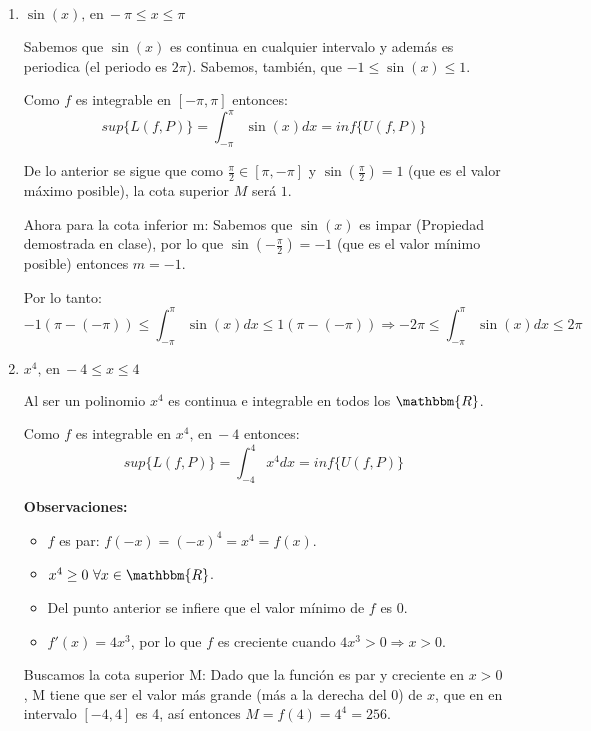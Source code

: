 \documentclass[12pt]{article}
\begin{document}
\begin{enumerate}[\hspace{9px} a)]
    \item \(\sin(x) \text{, en} \ -\pi \leq x \leq \pi\)\bigskip

        Sabemos que $\sin(x)$ es continua en cualquier intervalo y además es periodica (el periodo es $2\pi$). Sabemos, tambi\'en, que $-1\leq \sin(x)\leq 1$.\bigskip
        
        Como $f$ es integrable en $[-\pi,\pi]$ entonces: \[sup\{L(f,P)\}=\displaystyle\int_{-\pi}^{\pi}\sin(x)dx=inf\{U(f,P)\}\]
        
        De lo anterior se sigue que como \(\displaystyle\frac{\pi}{2}\in[\pi,-\pi]\) y $\sin\left(\displaystyle\frac{\pi}{2}\right)=1$ (que es el valor m\'aximo posible), la cota superior $M$ será $1$.\bigskip
        
        Ahora para la cota inferior m: Sabemos que $\sin(x)$ es impar (Propiedad demostrada en clase), por lo que \(\sin\left(-\displaystyle\frac{\pi}{2}\right)=-1\) (que  es el valor m\'inimo posible) entonces $m=-1$.\bigskip

        Por lo tanto: 
        \[-1(\pi-(-\pi)) \leq \int_{-\pi}^{\pi}\sin(x)dx \leq 1(\pi-(-\pi)) \Rightarrow -2\pi \leq \int_{-\pi}^{\pi}\sin(x)dx \leq 2\pi\]

    \item \(x^4 \text{, en} \ -4 \leq x \leq 4\)\bigskip

        Al ser un polinomio $x^4$ es continua e integrable en todos los $\mathbbm{R}$.\bigskip

        Como $f$ es integrable en \(x^4 \text{, en} \ -4\) entonces:  \[sup\{L(f,P)\}=\displaystyle\int_{-4}^{4}x^4dx=inf\{U(f,P)\}\]

        \textbf{Observaciones:}
        \begin{itemize}
            \item $f$ es par: \(f(-x)=(-x)^4=x^4=f(x)\).
            \item \(x^4\geq0 \ \forall x\in \mathbbm{R}\).
            \item Del punto anterior se infiere que el valor m\'inimo de $f$ es 0.
            \item \(f'(x) = 4x^3\), por lo que $f$ es creciente cuando \(4x^3>0 \Rightarrow x>0\).
        \end{itemize}


        Buscamos la cota superior M: Dado que la funci\'on es par y creciente en $x>0$, M tiene que ser el valor m\'as grande (m\'as a la derecha del 0) de $x$, que en en intervalo \([-4,4]\) es 4, as\'i entonces \(M = f(4) = 4^4 = 256\).


\end{enumerate}
\end{document}
